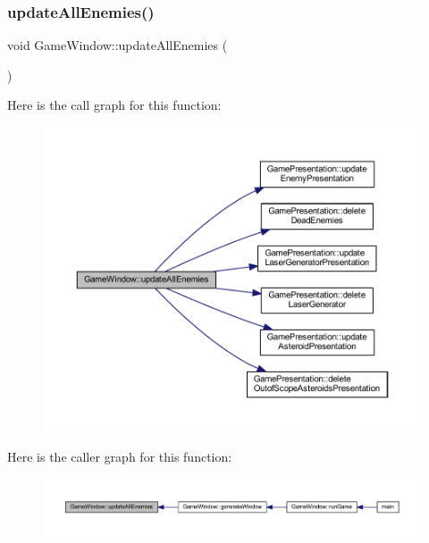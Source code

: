 \subsubsection{\texorpdfstring{update\+All\+Enemies()}{updateAllEnemies()}}
{\footnotesize\ttfamily void Game\+Window\+::update\+All\+Enemies (\begin{DoxyParamCaption}{ }\end{DoxyParamCaption})}

Here is the call graph for this function\+:\nopagebreak
\begin{figure}[H]
\begin{center}
\leavevmode
\includegraphics[width=350pt]{class_game_window_a62ed57d80a4eb7945777f5d383747bdf_cgraph}
\end{center}
\end{figure}
Here is the caller graph for this function\+:\nopagebreak
\begin{figure}[H]
\begin{center}
\leavevmode
\includegraphics[width=350pt]{class_game_window_a62ed57d80a4eb7945777f5d383747bdf_icgraph}
\end{center}
\end{figure}
\mbox{\label{class_game_window_a9ebcf385e9ed9fd52f1d8b2c88f9c091}} 
